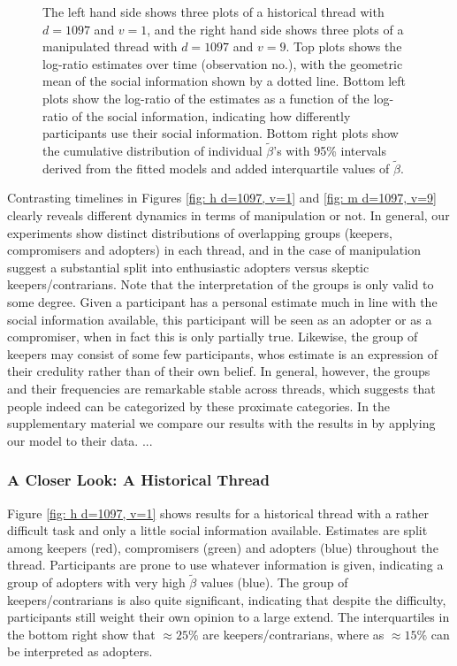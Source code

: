 \documentclass[9pt,twocolumn,twoside,lineno]{pnas-new}
\begin{document}
\begin{figure}[!ht]
\begin{subfigure}[t]{.1\linewidth}
	\end{subfigure}
	\caption{The left hand side shows three plots of a historical thread with $d=1097$ and $v=1$, and the right hand side shows three plots of a manipulated thread with $d=1097$ and $v=9$. Top plots shows the log-ratio estimates over time (observation no.), with the geometric mean of the social information shown by a dotted line. Bottom left plots show the log-ratio of the estimates as a function of the log-ratio of the social information, indicating how differently participants use their social information. Bottom right plots show the cumulative distribution of individual $\tilde{\beta}$'s with 95\% intervals derived from the fitted models and added interquartile values of $\tilde{\beta}$.}
	\label{fig: social influence}
\end{figure}

Contrasting timelines in Figures \ref{fig: h d=1097, v=1} and \ref{fig: m d=1097, v=9} clearly reveals different dynamics in terms of manipulation or not. In general, our experiments show distinct distributions of overlapping groups (keepers, compromisers and adopters) in each thread, and in the case of manipulation suggest a substantial split into enthusiastic adopters versus skeptic keepers/contrarians. Note that the interpretation of the groups is only valid to some degree. Given a participant has a personal estimate much in line with the social information available, this participant will be seen as an adopter or as a compromiser, when in fact this is only partially true. Likewise, the group of keepers may consist of some few participants, whos estimate is an expression of their credulity rather than of their own belief. In general, however, the groups and their frequencies are remarkable stable across threads, which suggests that people indeed can be categorized by these proximate categories. In the supplementary material we compare our results with the results in \citet{jayles2017social} by applying our model to their data. ...

\subsubsection*{A Closer Look: A Historical Thread}
Figure \ref{fig: h d=1097, v=1} shows results for a historical thread with a rather difficult task and only a little social information available. Estimates are split among keepers (red), compromisers (green) and adopters (blue) throughout the thread. Participants are prone to use whatever information is given, indicating a group of adopters with very high $\tilde{\beta}$ values (blue). The group of keepers/contrarians is also quite significant, indicating that despite the difficulty, participants still weight their own opinion to a large extend. The interquartiles in the bottom right show that $\approx25\%$ are keepers/contrarians, where as $\approx15\%$ can be interpreted as adopters.
\end{document}
